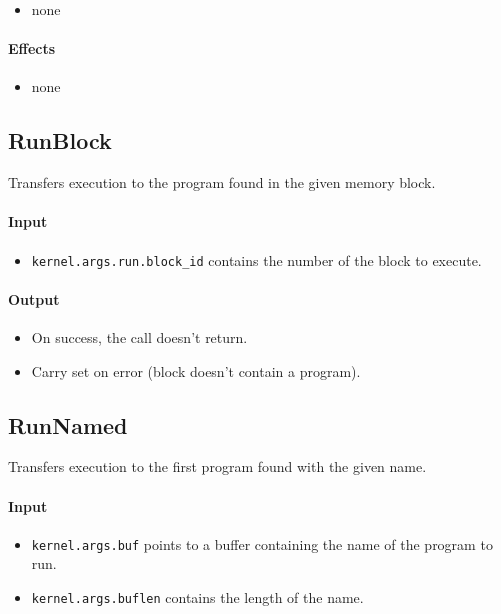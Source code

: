 \begin{itemize}
\item none
\end{itemize}

\paragraph{Effects}

\begin{itemize}
\item none
\end{itemize}


\subsection*{RunBlock}

Transfers execution to the program found in the given memory block.

\paragraph{Input}

\begin{itemize}
\item \verb+kernel.args.run.block_id+ contains the number of the block to execute.
\end{itemize}

\paragraph{Output}

\begin{itemize}
\item On success, the call doesn't return.
\item Carry set on error (block doesn't contain a program).
\end{itemize}


\subsection*{RunNamed}
Transfers execution to the first program found with the given name.

\paragraph{Input}

\begin{itemize}
\item \verb+kernel.args.buf+ points to a buffer containing the name of the program to run.
\item \verb+kernel.args.buflen+ contains the length of the name. 
\end{itemize}

